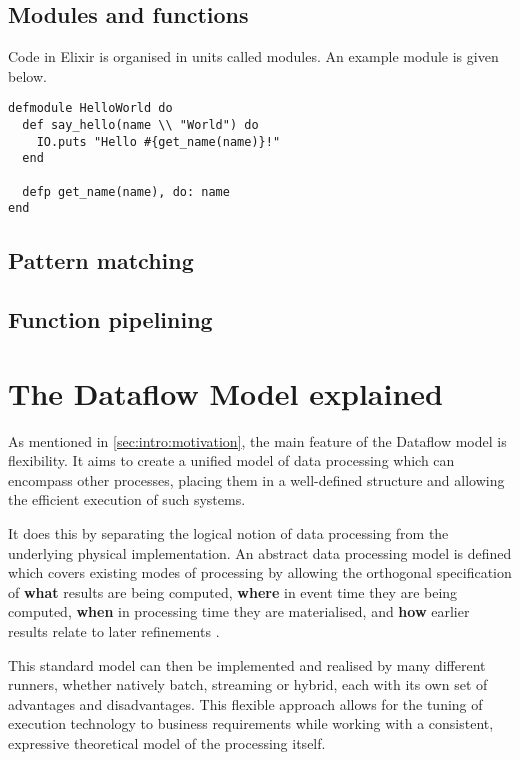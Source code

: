 \subsection{Modules and functions}

Code in Elixir is organised in units called modules.
An example module is given below.

\begin{verbatim}
defmodule HelloWorld do
  def say_hello(name \\ "World") do
    IO.puts "Hello #{get_name(name)}!"
  end
  
  defp get_name(name), do: name
end	
\end{verbatim}


\subsection{Pattern matching}

\subsection{Function pipelining}

\section{The Dataflow Model explained}\label{sec:prep:dataflow}

As mentioned in \cref{sec:intro:motivation}, the main feature of the Dataflow model is flexibility.
It aims to create a unified model of data processing which can encompass other processes, placing them in a well-defined structure and allowing the efficient execution of such systems.

It does this by separating the logical notion of data processing from the underlying physical implementation.
An abstract data processing model is defined which covers existing modes of processing by allowing the orthogonal specification of \textbf{what} results are being computed, \textbf{where} in event time they are being computed, \textbf{when} in processing time they are materialised, and \textbf{how} earlier results relate to later refinements \cite[p.~1793]{Akidau:2015}.

This standard model can then be implemented and realised by many different runners, whether natively batch, streaming or hybrid, each with its own set of advantages and disadvantages. 
This flexible approach allows for the tuning of execution technology to business requirements while working with a consistent, expressive theoretical model of the processing itself.

